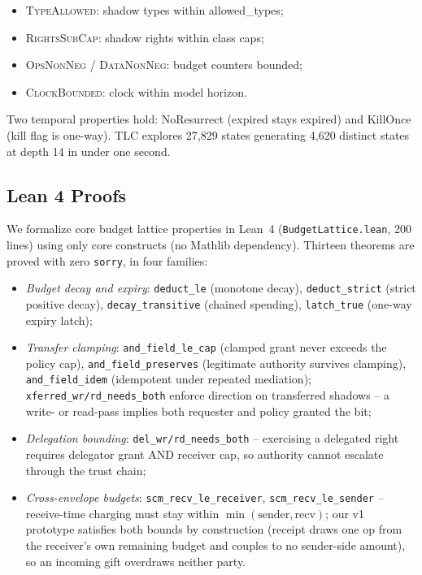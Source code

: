 \documentclass[letterpaper,twocolumn,10pt]{article}
\begin{document}
\begin{itemize}
\item \textsc{TypeAllowed}: shadow types within allowed\_types;
\item \textsc{RightsSubCap}: shadow rights within class caps;
\item \textsc{OpsNonNeg} / \textsc{DataNonNeg}: budget counters bounded;
\item \textsc{ClockBounded}: clock within model horizon.
\end{itemize}

Two temporal properties hold: NoResurrect (expired stays expired) and
KillOnce (kill flag is one-way).  TLC explores 27{,}829 states
generating 4{,}620 distinct states at depth 14 in under one second.

\subsection{Lean 4 Proofs}

We formalize core budget lattice properties in Lean~4
(\texttt{BudgetLattice.lean}, 200 lines) using only core constructs
(no Mathlib dependency).  Thirteen theorems are proved with zero
\texttt{sorry}, in four families:

\begin{itemize}
\item \emph{Budget decay and expiry}: \texttt{deduct\_le}
      (monotone decay), \texttt{deduct\_strict} (strict positive
      decay), \texttt{decay\_transitive} (chained spending),
      \texttt{latch\_true} (one-way expiry latch);
\item \emph{Transfer clamping}:
      \texttt{and\_field\_le\_cap} (clamped grant never exceeds the
      policy cap), \texttt{and\_field\_preserves} (legitimate
      authority survives clamping), \texttt{and\_field\_idem}
      (idempotent under repeated mediation);
      \texttt{xferred\_wr/rd\_needs\_both} enforce direction on
      transferred shadows -- a write- or read-pass implies both
      requester and policy granted the bit;
\item \emph{Delegation bounding}:
      \texttt{del\_wr/rd\_needs\_both} -- exercising a delegated
      right requires delegator grant AND receiver cap, so authority
      cannot escalate through the trust chain;
\item \emph{Cross-envelope budgets}:
      \texttt{scm\_recv\_le\_receiver},
      \texttt{scm\_recv\_le\_sender} -- receive-time charging must
      stay within $\min(\mathrm{sender},\mathrm{recv})$; our v1
      prototype satisfies both bounds by construction (receipt draws
      one op from the receiver's own remaining budget and couples to
      no sender-side amount), so an incoming gift overdraws neither
      party.
\end{itemize}
\end{document}
